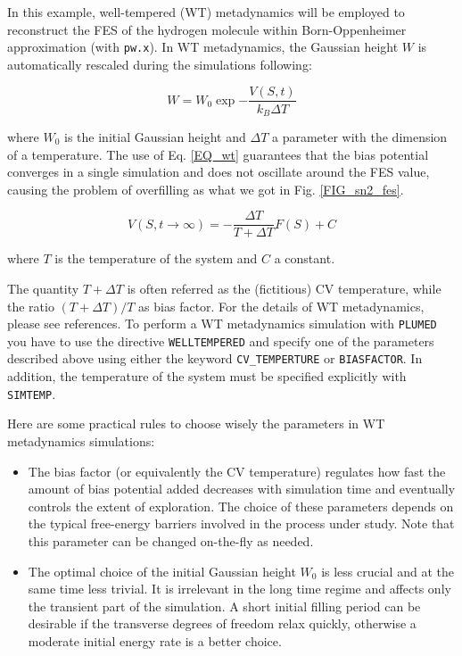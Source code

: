 \documentclass[12pt,a4paper]{article}
\begin{document}
In this example, well-tempered (WT) metadynamics\cite{Barducci:2008ua} will be employed to reconstruct the FES of the hydrogen molecule within Born-Oppenheimer approximation (with \texttt{pw.x}). In WT metadynamics, the Gaussian height $W$ is automatically rescaled during the simulations following:

\begin{equation}
W = W_{0} \exp{-\frac{V(S, t)}{k_{B}\Delta T}}
\label{EQ_wt}
\end{equation}

where $W_{0}$ is the initial Gaussian height and $\Delta T$ a parameter with the dimension of a temperature. The use of Eq. \ref{EQ_wt} guarantees that the bias potential converges in a single simulation and does not oscillate around the FES value, causing the problem of overfilling as what we got in Fig. \ref{FIG_sn2_fes}.

\begin{equation}
V(S, t\to \infty) = -\frac{\Delta T}{T + \Delta T} F(S) + C
\label{EQ_wt_v}
\end{equation}

where $T$ is the temperature of the system and $C$ a constant.

The quantity $T + \Delta T$ is often referred as the (fictitious) CV temperature, while the ratio $(T + \Delta T) / T$ as bias factor. For the details of WT metadynamics, please see references\cite{Barducci:2008ua, Laio:2008wu}. To perform a WT metadynamics simulation with \texttt{PLUMED} you have to use the directive \texttt{WELLTEMPERED} and specify one of the parameters described above using either the keyword \texttt{CV\_TEMPERTURE} or \texttt{BIASFACTOR}. In addition, the temperature of the system must be specified explicitly with \texttt{SIMTEMP}.

Here are some practical rules to choose wisely the parameters in WT metadynamics simulations:

\begin{itemize}
\item The bias factor (or equivalently the CV temperature) regulates how fast the amount of bias potential added decreases with simulation time and eventually controls the extent of exploration. The choice of these parameters depends on the typical free-energy barriers involved in the process under study. Note that this parameter can be changed on-the-fly as needed.
\item The optimal choice of the initial Gaussian height $W_{0}$ is less crucial and at the same time less trivial. It is irrelevant in the long time regime and affects only the transient part of the simulation. A short initial filling period can be desirable if the transverse degrees of freedom relax quickly, otherwise a moderate initial energy rate is a better choice.
\end{itemize}
\end{document}
